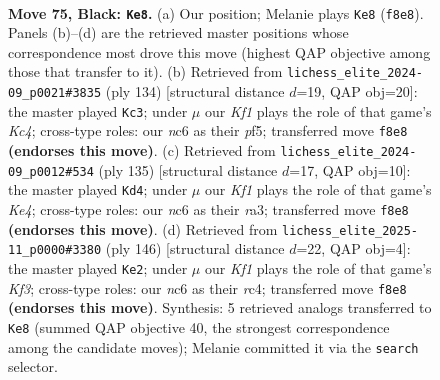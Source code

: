 \documentclass[11pt]{article}
\begin{document}
\clearpage

\begin{figure}[p]\centering
\begin{subfigure}{0.46\textwidth}\centering
\resizebox{\linewidth}{!}{%
\newchessgame
\chessboard[
  setfen={5k2/6p1/2NR1p2/7p/3P3P/r5P1/6K1/8 b - - 44 75},
  showmover=false,
  pgfstyle=straightmove, color=movearrow, markmove={f8-e8}
]}
\caption{}
\end{subfigure}\hfill
\begin{subfigure}{0.46\textwidth}\centering
\resizebox{\linewidth}{!}{%
\newchessgame
\chessboard[
  setfen={8/R7/1r2p1k1/5p2/p1K2P2/P7/1P6/8 w - - 2 68},
  showmover=false,
  pgfstyle=straightmove, color=movearrow, markmove={c4-c3}
]}
\caption{}
\end{subfigure}
\\[4pt]
\begin{subfigure}{0.46\textwidth}\centering
\resizebox{\linewidth}{!}{%
\newchessgame
\chessboard[
  setfen={8/KP6/4p3/4k2p/6p1/R5P1/7P/1r6 b - - 4 68},
  showmover=false,
  pgfstyle=straightmove, color=movearrow, markmove={e5-d4}
]}
\caption{}
\end{subfigure}\hfill
\begin{subfigure}{0.46\textwidth}\centering
\resizebox{\linewidth}{!}{%
\newchessgame
\chessboard[
  setfen={8/2p4R/1p1p2k1/1P1P4/2r2P2/5K2/8/8 w - - 4 74},
  showmover=false,
  pgfstyle=straightmove, color=movearrow, markmove={f3-e2}
]}
\caption{}
\end{subfigure}
\caption{\textbf{Move 75, Black: \texttt{Ke8}.} (a) Our position; Melanie plays \texttt{Ke8} (\texttt{f8e8}). Panels (b)--(d) are the retrieved master positions whose correspondence most drove this move (highest QAP objective among those that transfer to it). (b) Retrieved from \texttt{lichess\_elite\_2024-09\_p0021\#3835} (ply 134) [structural distance $d$=19, QAP obj=20]: the master played \texttt{Kc3}; under $\mu$ our \emph{Kf1} plays the role of that game's \emph{Kc4}; cross-type roles: our \emph{n}c6 as their \emph{p}f5; transferred move \texttt{f8e8} \textbf{(endorses this move)}. (c) Retrieved from \texttt{lichess\_elite\_2024-09\_p0012\#534} (ply 135) [structural distance $d$=17, QAP obj=10]: the master played \texttt{Kd4}; under $\mu$ our \emph{Kf1} plays the role of that game's \emph{Ke4}; cross-type roles: our \emph{n}c6 as their \emph{r}a3; transferred move \texttt{f8e8} \textbf{(endorses this move)}. (d) Retrieved from \texttt{lichess\_elite\_2025-11\_p0000\#3380} (ply 146) [structural distance $d$=22, QAP obj=4]: the master played \texttt{Ke2}; under $\mu$ our \emph{Kf1} plays the role of that game's \emph{Kf3}; cross-type roles: our \emph{n}c6 as their \emph{r}c4; transferred move \texttt{f8e8} \textbf{(endorses this move)}. Synthesis: 5 retrieved analogs transferred to \texttt{Ke8} (summed QAP objective 40, the strongest correspondence among the candidate moves); Melanie committed it via the \texttt{search} selector.}
\label{fig:thought-m149}
\end{figure}
\end{document}
